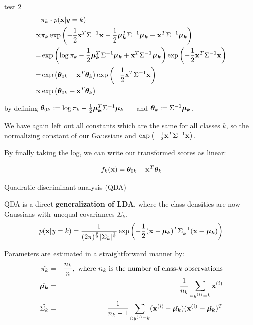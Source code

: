 \documentclass[11pt,compress,t,notes=noshow, xcolor=table]{beamer}
\begin{document}
\begin{vbframe}{test 2}
\begin{eqnarray*}
& \pi_{k} \cdot p(\mathbf{x} | y= k) \\
  \propto& \pi_{k} \exp\left(- \frac{1}{2} \mathbf{x}^T\Sigma^{-1}\mathbf{x} - \frac{1}{2} \bm{\mu_{k}}^T \Sigma^{-1} \bm{\mu_{k}} + \mathbf{x}^T \Sigma^{-1} \bm{\mu_{k}} \right) \\
=& \exp\left(\log \pi_{k}  - \frac{1}{2} \bm{\mu_{k}}^T \Sigma^{-1} \bm{\mu_{k}} + \mathbf{x}^T \Sigma^{-1} \bm{\mu_{k}} \right) \exp\left(- \frac{1}{2} \mathbf{x}^T\Sigma^{-1}\mathbf{x}\right) \\
=& \exp\left(\bm{\theta}_{0k} + \mathbf{x}^T \bm{\theta}_k\right) \exp\left(- \frac{1}{2} \mathbf{x}^T\Sigma^{-1}\mathbf{x}\right)\\
\propto& \exp\left(\bm{\theta}_{0k} + \mathbf{x}^T \bm{\theta}_k\right) 
\end{eqnarray*}

by defining
$\bm{\theta}_{0k} := \log \pi_{k}  - \frac{1}{2} \bm{\mu_{k}}^T \Sigma^{-1} \bm{\mu_{k}}$ $\quad$ and $\bm{\theta}_k := \Sigma^{-1} \bm{\mu_{k}}$.

\lz

We have again left out all constants which are the same for all classes $k$, 
  so the normalizing constant of our Gaussians and 
  $\exp\left(- \frac{1}{2} \mathbf{x}^T\Sigma^{-1}\mathbf{x}\right)$.

\lz

By finally taking the log, we can write our transformed scores as linear:  

$$ f_{k}(\mathbf{x}) =  \bm{\theta}_{0k} + \mathbf{x}^T \bm{\theta}_k $$

\end{vbframe}


\begin{vbframe}{Quadratic discriminant analysis (QDA)}

QDA is a direct \textbf{generalization of LDA}, where the class densities are now Gaussians with unequal covariances $\Sigma_k$.
$$
p(\mathbf{x} | y= k) = \frac{1}{(2\pi)^{\frac{p}{2}}|\Sigma_k|^{\frac{1}{2}}} \exp\left(-\frac{1}{2}(\mathbf{x} - \bm{\mu_{k}})^T \Sigma_k^{-1} (\mathbf{x} - \bm{\mu_{k}})\right)
$$

\lz

Parameters are estimated in a straightforward manner by:\\
\begin{eqnarray*}
\hat{\pi_{k}} &=& \frac{n_k}{n},\text{ where $n_k$ is the number of class-$k$ observations} \\
\hat{\bm{\mu_{k}}} &=& \frac{1}{n_k}\sum_{i: y^{(i)} = k} \mathbf{x}^{(i)} \\
\hat{\Sigma_k} &=& \frac{1}{n_k - 1} \sum_{i: y^{(i)} = k} (\mathbf{x}^{(i)} - \hat{\bm{\mu_{k}}}) (\mathbf{x}^{(i)} - \hat{\bm{\mu_{k}}})^T \\
\end{eqnarray*}

\end{vbframe}
\end{document}
